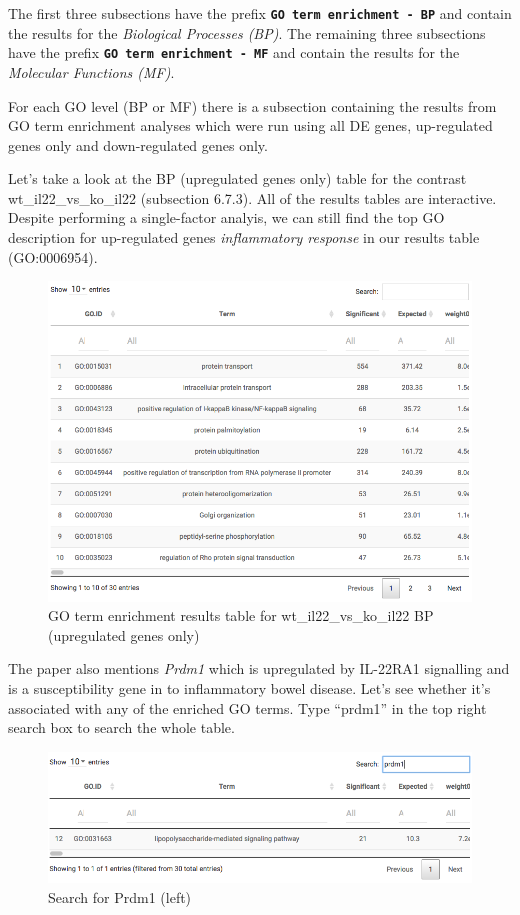 \documentclass[11pt]{article}
\makeatletter
\def\maxwidth{\ifdim\Gin@nat@width>\linewidth\linewidth
    \else\Gin@nat@width\fi}
\let\Oldincludegraphics\includegraphics
\renewcommand{\includegraphics}[1]{\Oldincludegraphics[width=.8\maxwidth, height=.55\textheight, keepaspectratio]{#1}}
\makeatother
\begin{document}
The first three subsections have the prefix
\textbf{\texttt{GO\ term\ enrichment\ -\ BP}} and contain the results
for the \textit{Biological Processes (BP)}. The remaining three
subsections have the prefix
\textbf{\texttt{GO\ term\ enrichment\ -\ MF}} and contain the results
for the \textit{Molecular Functions (MF)}.

For each GO level (BP or MF) there is a subsection containing the
results from GO term enrichment analyses which were run using all DE
genes, up-regulated genes only and down-regulated genes only.

Let's take a look at the BP (upregulated genes only) table for the
contrast wt\_il22\_vs\_ko\_il22 (subsection 6.7.3). All of the results
tables are interactive. Despite performing a single-factor analyis, we
can still find the top GO description for up-regulated genes
\textit{inflammatory response} in our results table (GO:0006954).

    \begin{figure}[!h]
\centering
\includegraphics{images/BPupTable.png}
\caption{GO term enrichment results table for wt\_il22\_vs\_ko\_il22 BP
(upregulated genes only)}
\end{figure}

    The paper also mentions \textit{Prdm1} which is upregulated by IL-22RA1
signalling and is a susceptibility gene in to inflammatory bowel
disease. Let's see whether it's associated with any of the enriched GO
terms. Type ``prdm1'' in the top right search box to search the whole
table.

    \begin{figure}[H]
\centering
\includegraphics{images/BPupPrdm1Left.png}
\caption{Search for Prdm1 (left)}
\end{figure}
\end{document}
